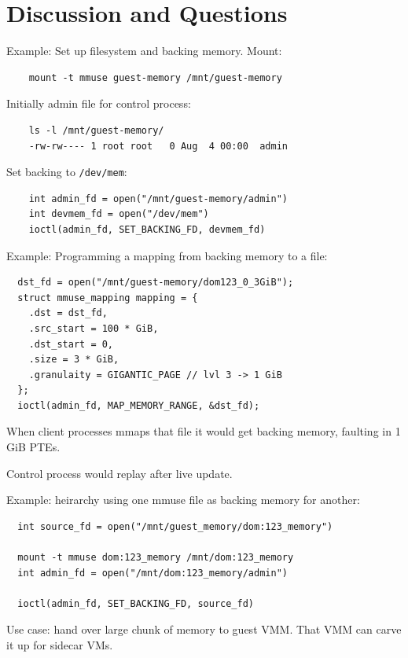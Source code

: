 \documentclass{beamer}
\begin{document}
\section{Discussion and Questions}

\begin{frame}[fragile]
  Example: Set up filesystem and backing memory. Mount:

  \begin{verbatim}
    mount -t mmuse guest-memory /mnt/guest-memory
  \end{verbatim}
  \vspace{1cm}
  Initially admin file for control process:
  \begin{verbatim}
    ls -l /mnt/guest-memory/
    -rw-rw---- 1 root root   0 Aug  4 00:00  admin
  \end{verbatim}
  \vspace{0.8cm}
  Set backing to \texttt{/dev/mem}:
  \begin{verbatim}
    int admin_fd = open("/mnt/guest-memory/admin")
    int devmem_fd = open("/dev/mem")
    ioctl(admin_fd, SET_BACKING_FD, devmem_fd)
  \end{verbatim}
\end{frame}

\begin{frame}[fragile]
  Example: Programming a mapping from backing memory to a file:
  \begin{verbatim}
  dst_fd = open("/mnt/guest-memory/dom123_0_3GiB");
  struct mmuse_mapping mapping = {
    .dst = dst_fd,
    .src_start = 100 * GiB,
    .dst_start = 0,
    .size = 3 * GiB,
    .granulaity = GIGANTIC_PAGE // lvl 3 -> 1 GiB
  };
  ioctl(admin_fd, MAP_MEMORY_RANGE, &dst_fd);
  \end{verbatim}

  When client processes mmaps that file it would get backing memory, faulting in 1 GiB PTEs.

  Control process would replay after live update.
\end{frame}

\begin{frame}[fragile]
  Example: heirarchy using one mmuse file as backing memory for another:\\

  \begin{verbatim}
  int source_fd = open("/mnt/guest_memory/dom:123_memory")

  mount -t mmuse dom:123_memory /mnt/dom:123_memory
  int admin_fd = open("/mnt/dom:123_memory/admin")

  ioctl(admin_fd, SET_BACKING_FD, source_fd)
  \end{verbatim}
  \vspace{0.7cm}
  Use case: hand over large chunk of memory to guest VMM. That VMM can carve it up for sidecar VMs.
\end{frame}
\end{document}
